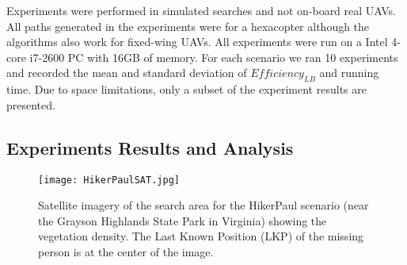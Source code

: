 \documentclass[journal]{IEEEtran}
\begin{document}
Experiments were performed in simulated searches and not on-board real UAVs. All paths generated in the experiments were for a hexacopter although the algorithms also work for fixed-wing UAVs. All experiments were run on a Intel 4-core i7-2600 PC with 16GB of memory. For each scenario we ran 10 experiments and recorded the mean and standard deviation of $\mathit{Efficiency_{LB}}$ and running time. Due to space limitations, only a subset of the experiment results are presented.

\subsection{Experiments Results and Analysis}

\begin{figure}
\centering
\texttt{[image: HikerPaulSAT.jpg]}
\caption{Satellite imagery of the search area for the HikerPaul scenario (near the Grayson Highlands State Park in Virginia) showing the vegetation density. The Last Known Position (LKP) of the missing person is at the center of the image.}
\label{HikerPaulSAT}
\end{figure}
\end{document}

